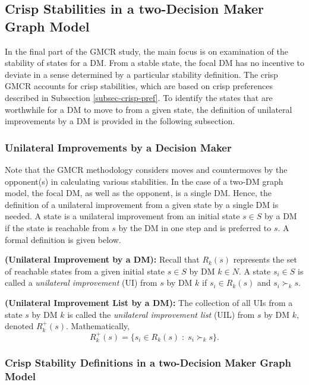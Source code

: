 \subsection{Crisp Stabilities in a two-Decision Maker Graph Model}

In the final part of the GMCR study, the main focus is on examination of the stability of states for a DM. From a stable state, the focal DM has no incentive to deviate in a sense determined by a particular stability definition. The crisp GMCR accounts for crisp stabilities, which are based on crisp preferences described in Subsection \ref{subsec-crisp-pref}. To identify the states that are worthwhile for a DM to move to from a given state, the definition of unilateral improvements by a DM is provided in the following subsection.

\subsubsection{Unilateral Improvements by a Decision Maker}

Note that the GMCR methodology considers moves and countermoves by the opponent(s) in calculating various stabilities. In the case of a two-DM graph model, the focal DM, as well as the opponent, is a single DM. Hence, the definition of a unilateral improvement from a given state by a single DM is needed. A state is a unilateral improvement from an initial state $s \in S$ by a DM if the state is reachable from $s$ by the DM in one step and is preferred to $s$. A formal definition is given below.

\begin{definition}
\rm {\bf (Unilateral Improvement by a DM):} Recall that $R_k(s)$ represents the set of reachable states from a given initial state $s \in S$ by DM $k \in N$. A state $s_i \in S$ is called a \emph{unilateral improvement} (UI) from $s$ by DM $k$ if $s_i \in R_k(s)$ and $s_i \succ_k s$.
\end{definition}

\begin{definition}\label{UIL-DM}
\rm {\bf (Unilateral Improvement List by a DM):} The collection of all UIs from a state $s$ by DM $k$ is called the \emph{unilateral improvement list} (UIL) from $s$ by DM $k$, denoted $R_k^+(s)$. Mathematically,
$$R_k^+(s)=\{s_i \in R_k(s) \; : \; s_i\succ_k s\}.$$
\end{definition}

\subsubsection{Crisp Stability Definitions in a two-Decision Maker Graph Model}\label{sssec-crisp-2dm-stab}

